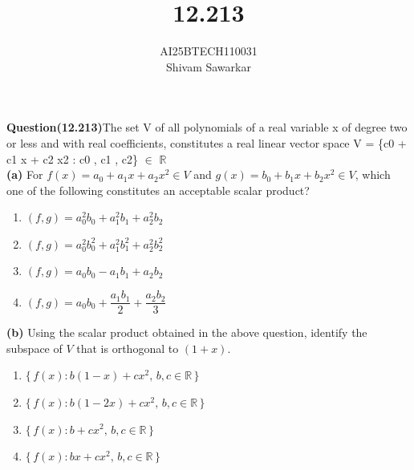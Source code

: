 \documentclass[journal]{IEEEtran}
\begin{document}

\vspace{3cm}

\title{12.213}
\author{AI25BTECH110031 \\ Shivam Sawarkar}
 \maketitle
{\let\newpage\relax\maketitle}

\renewcommand{\thefigure}{\theenumi}
\renewcommand{\thetable}{\theenumi}
\setlength{\intextsep}{10pt} %


\renewcommand{\thetable}{\theenumi}

\textbf{Question(12.213)}The set V of all polynomials of a real variable x of degree two or less and with real coefficients, constitutes a real linear vector space V = \{c0 + c1 x + c2 x2 : c0 , c1 , c2\} $\in$ $\mathbb{R}$ \\ 
\textbf{(a)} For $f(x) = a_0 + a_1x + a_2x^2 \in V$ and $g(x) = b_0 + b_1x + b_2x^2 \in V$, which one of the following constitutes an acceptable scalar product?

\begin{enumerate}[label=(\roman*)]
    \item $(f,g) = a_0^2b_0 + a_1^2b_1 + a_2^2b_2$
    \item $(f,g) = a_0^2b_0^2 + a_1^2b_1^2 + a_2^2b_2^2$
    \item $(f,g) = a_0b_0 - a_1b_1 + a_2b_2$
    \item $(f,g) = a_0b_0 + \dfrac{a_1b_1}{2} + \dfrac{a_2b_2}{3}$
\end{enumerate}

\textbf{(b)} Using the scalar product obtained in the above question, identify the subspace of $V$ that is orthogonal to $(1+x)$.

\begin{enumerate}[label=(\roman*)]
    \item $\{\, f(x) : b(1 - x) + c x^2,\, b,c \in \mathbb{R} \,\}$
    \item $\{\, f(x) : b(1 - 2x) + c x^2,\, b,c \in \mathbb{R} \,\}$
    \item $\{\, f(x) : b + c x^2,\, b,c \in \mathbb{R} \,\}$
    \item $\{\, f(x) : b x + c x^2,\, b,c \in \mathbb{R} \,\}$
\end{enumerate}
\end{document}
